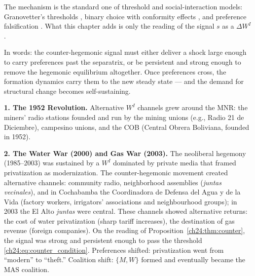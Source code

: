 \documentclass[../structural_economics_book.tex]{subfiles}
\begin{document}
The mechanism is the standard one of threshold and social-interaction models: Granovetter's thresholds \citep{granovetter1978threshold}, binary choice with conformity effects \citep{brock2001discrete}, and preference falsification \citep{kuran1989sparks}. What this chapter adds is only the reading of the signal $s$ as a $\Delta W^I$.

In words: the counter-hegemonic signal must either deliver a shock large enough to carry preferences past the separatrix, or be persistent and strong enough to remove the hegemonic equilibrium altogether. Once preferences cross, the formation dynamics carry them to the new steady state --- and the demand for structural change becomes self-sustaining.

\begin{example}\label{ch24:ex:counter}
\textbf{1. The 1952 Revolution.} Alternative $W^I$ channels grew around the MNR: the miners' radio stations founded and run by the mining unions (e.g., Radio 21 de Diciembre), campesino unions, and the COB (Central Obrera Boliviana, founded in 1952).

\textbf{2. The Water War (2000) and Gas War (2003).} The neoliberal hegemony (1985--2003) was sustained by a $W^I$ dominated by private media that framed privatization as modernization. The counter-hegemonic movement created alternative channels: community radio, neighborhood assemblies (\textit{juntas vecinales}), and in Cochabamba the Coordinadora de Defensa del Agua y de la Vida (factory workers, irrigators' associations and neighbourhood groups); in 2003 the El Alto \textit{juntas} were central. These channels showed alternative returns: the cost of water privatization (sharp tariff increases), the destination of gas revenue (foreign companies). On the reading of Proposition~\ref{ch24:thm:counter}, the signal was strong and persistent enough to pass the threshold \eqref{ch24:eq:counter_condition}. Preferences shifted: privatization went from ``modern'' to ``theft.'' Coalition shift: $\{M, W\}$ formed and eventually became the MAS coalition.


\end{example}
\end{document}
